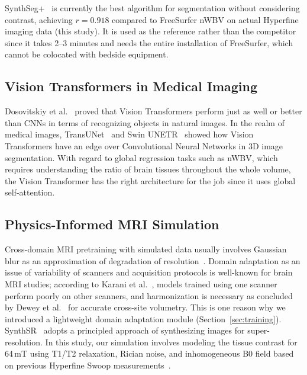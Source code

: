 \documentclass{ieeeaccess}
\begin{document}
SynthSeg+~\cite{billot2023synthseg} is currently the best algorithm for
segmentation without considering contrast, achieving $r = 0.918$
compared to FreeSurfer nWBV on actual Hyperfine imaging data (this study). It
is used as the reference rather than the competitor since it takes 2--3
minutes and needs the entire installation of FreeSurfer, which cannot be
colocated with bedside equipment.

\subsection{Vision Transformers in Medical Imaging}

Dosovitskiy et al.~\cite{dosovitskiy2020image} proved that Vision Transformers
perform just as well or better than CNNs in terms of recognizing objects in
natural images. In the realm of medical images,
TransUNet~\cite{chen2021transunet} and Swin
UNETR~\cite{hatamizadeh2021swin} showed how Vision Transformers have an edge
over Convolutional Neural Networks in 3D image segmentation. With regard to
global regression tasks such as nWBV, which requires understanding the ratio
of brain tissues throughout the whole volume, the Vision Transformer has the
right architecture for the job since it uses global self-attention.

\subsection{Physics-Informed MRI Simulation}

Cross-domain MRI pretraining with simulated data usually involves Gaussian
blur as an approximation of degradation of
resolution~\cite{zhao2021superresolution}. Domain adaptation as an issue of
variability of scanners and acquisition protocols is well-known for brain MRI
studies; according to Karani et al.~\cite{karani2018lifelong}, models trained
using one scanner perform poorly on other scanners, and harmonization is
necessary as concluded by Dewey et al.~\cite{dewey2019deepharmony} for
accurate cross-site volumetry. This is one reason why we introduced a
lightweight domain adaptation module (Section~\ref{sec:training}). SynthSR~\cite{iglesias2023synthsr} adopts a principled approach of
synthesizing images for super-resolution. In this study, our simulation
involves modeling the tissue contrast for 64\,mT using T1/T2 relaxation,
Rician noise, and inhomogeneous B0 field based on previous Hyperfine Swoop
measurements~\cite{vasa2025}.

\end{document}
